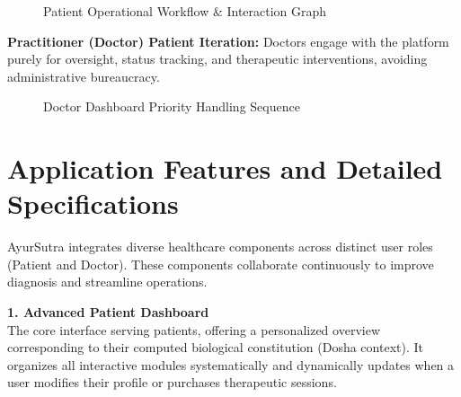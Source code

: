 \documentclass[10pt]{article}
\begin{document}
{\begin{figure}[H]
{
    }
    \caption{Patient Operational Workflow \& Interaction Graph}
\end{figure}

\textbf{Practitioner (Doctor) Patient Iteration:}
Doctors engage with the platform purely for oversight, status tracking, and therapeutic interventions, avoiding administrative bureaucracy.

\begin{figure}[H]
    \centering
    \caption{Doctor Dashboard Priority Handling Sequence}
\end{figure}

\newpage
\section{Application Features and Detailed Specifications}
AyurSutra integrates diverse healthcare components across distinct user roles (Patient and Doctor). These components collaborate continuously to improve diagnosis and streamline operations.

\textbf{1. Advanced Patient Dashboard}\\
The core interface serving patients, offering a personalized overview corresponding to their computed biological constitution (Dosha context). It organizes all interactive modules systematically and dynamically updates when a user modifies their profile or purchases therapeutic sessions.

}
\end{document}
